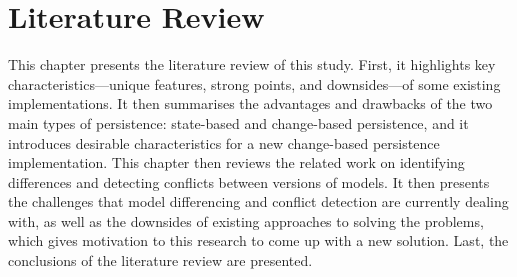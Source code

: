 \chapter{Literature Review}
\label{ch:literature_review}

This chapter presents the literature review of this study. First, it highlights key characteristics—unique features, strong points, and downsides—of some existing implementations. It then summarises the advantages and drawbacks of the two main types of persistence: state-based and change-based persistence, and it introduces desirable characteristics for a new change-based persistence implementation. This chapter then reviews the related work on identifying differences and detecting conflicts between versions of models. It then presents the challenges that model differencing and conflict detection are currently dealing with, as well as the downsides of existing approaches to solving the problems, which gives motivation to this research to come up with a new solution. Last, the conclusions of the literature review are presented.

%
%

